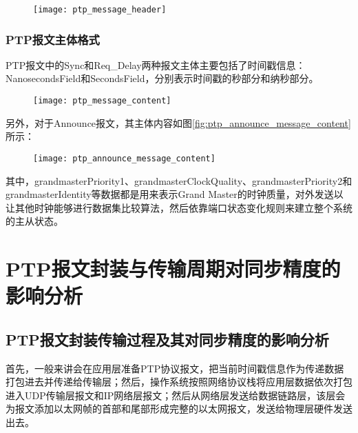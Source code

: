 \begin{figure}[!hbp]
  \centering
  \begin{minipage}[b]{0.6\textwidth}
    \captionstyle{\centering}
    \centering
    \texttt{[image: ptp\_message\_header]}
  \end{minipage}     
\end{figure}

\subsubsection{PTP报文主体格式}
PTP报文中的Sync和Req\_Delay两种报文主体主要包括了时间戳信息：NanosecondsField和SecondsField，分别表示时间戳的秒部分和纳秒部分。
\begin{figure}[!hbp]
  \centering
  \begin{minipage}[b]{0.6\textwidth}
    \captionstyle{\centering}
    \centering
    \texttt{[image: ptp\_message\_content]}
  \end{minipage}     
\end{figure}

另外，对于Announce报文，其主体内容如图\ref{fig:ptp_announce_message_content}所示：

\begin{figure}[!hbp]
  \centering
  \begin{minipage}[b]{0.6\textwidth}
    \captionstyle{\centering}
    \centering
    \texttt{[image: ptp\_announce\_message\_content]}
  \end{minipage}     
\end{figure}

其中，grandmasterPriority1、grandmasterClockQuality、grandmasterPriority2和grandmasterIdentity等数据都是用来表示Grand Master的时钟质量，对外发送以让其他时钟能够进行数据集比较算法，然后依靠端口状态变化规则来建立整个系统的主从状态。

\section{PTP报文封装与传输周期对同步精度的影响分析}

\subsection{PTP报文封装传输过程及其对同步精度的影响分析}
首先，一般来讲会在应用层准备PTP协议报文，把当前时间戳信息作为传递数据打包进去并传递给传输层；然后，操作系统按照网络协议栈将应用层数据依次打包进入UDP传输层报文和IP网络层报文；然后从网络层发送给数据链路层，该层会为报文添加以太网帧的首部和尾部形成完整的以太网报文，发送给物理层硬件发送出去\supercite{54}。

